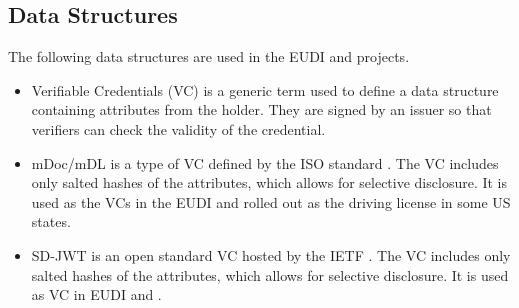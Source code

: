\subsection{Data Structures}

The following data structures are used in the EUDI and \swiyu projects.

\begin{itemize}
    \item Verifiable Credentials (VC) is a generic term used to define a data structure containing attributes from the holder. 
    They are signed by an issuer so that verifiers can check the validity of the credential.
    \item mDoc/mDL is a type of VC defined by the ISO standard \cite{ISO18013-5_2021}.
    The VC includes only salted hashes of the attributes, which allows for selective disclosure.
    It is used as the VCs in the EUDI and rolled out as the driving license in some US states.
    \item SD-JWT is an open standard VC hosted by the IETF \cite{SDJWT}.
    The VC includes only salted hashes of the attributes, which allows for selective disclosure.
    It is used as VC in EUDI and \swiyu.
\end{itemize}

